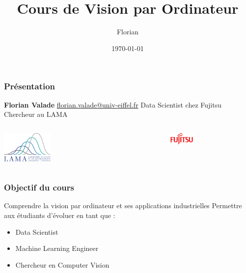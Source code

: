 \documentclass{beamer}
\title{Cours de Vision par Ordinateur}
\author{Florian}
\date{\today}
\begin{document}
\begin{frame}
    \titlepage
\end{frame}

\begin{frame}
    \frametitle{Présentation}
    \textbf{Florian Valade} \newline
    \href{mailto:florian.valade@univ-eiffel.fr}{florian.valade@univ-eiffel.fr} \newline
    Data Scientist chez Fujitsu \newline
    Chercheur au LAMA \newline
    \begin{columns}
        \begin{column}{0.5\textwidth}
            \begin{flushleft}
                \includegraphics[width=0.3\textwidth]{images/lama.png}
            \end{flushleft}
        \end{column}
        \begin{column}{0.5\textwidth}
            \begin{flushright}
                \includegraphics[width=0.3\textwidth]{images/fujitsu.png}
            \end{flushright}
        \end{column}
    \end{columns}
\end{frame}

\begin{frame}
    \frametitle{Objectif du cours}
    Comprendre la vision par ordinateur et ses applications industrielles \newline
    Permettre aux étudiants d'évoluer en tant que :
    \begin{itemize}
        \item Data Scientist
        \item Machine Learning Engineer
        \item Chercheur en Computer Vision
    \end{itemize}
\end{frame}
\end{document}
